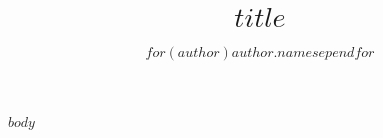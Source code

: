 \documentclass[letterpaper]{article}
\title{$title$}
\author{$for(author)$$author.name$$sep$\quad $endfor$}
\date{}
\begin{document}
\maketitle

$body$
\end{document}
